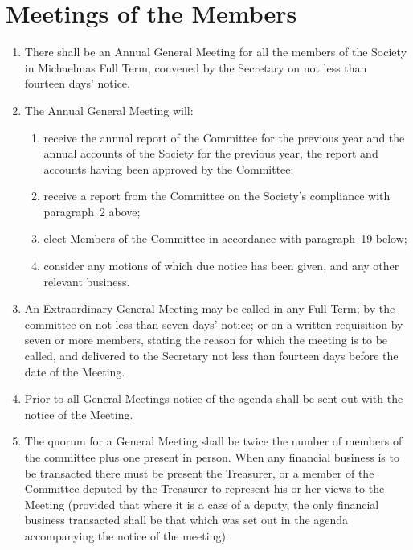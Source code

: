 \documentclass[11pt]{article}
\begin{document}
\section{Meetings of the Members}
\begin{enumerate}
\item There shall be an Annual General Meeting for all the members of the Society in Michaelmas Full Term, convened by the Secretary on not less than fourteen days' notice.
\item The Annual General Meeting will:
\begin{enumerate}
\item receive the annual report of the Committee for the previous year and the annual accounts of the Society for the previous year, the report and accounts having been approved by the Committee;
\item receive a report from the Committee on the Society's compliance with paragraph~2 above;
\item elect Members of the Committee in accordance with paragraph~19 below;
\item consider any motions of which due notice has been given, and any other relevant business.
\end{enumerate}
\item An Extraordinary General Meeting may be called in any Full Term; by the committee on not less than seven days' notice; or on a written requisition by seven or more members, stating the reason for which the meeting is to be called, and delivered to the Secretary not less than fourteen days before the date of the Meeting.
\item Prior to all General Meetings notice of the agenda shall be sent out with the notice of the Meeting.
\item The quorum for a General Meeting shall be twice the number of members of the committee plus one present in person. When any financial business is to be transacted there must be present the Treasurer, or a member of the Committee deputed by the Treasurer to represent his or her views to the Meeting (provided that where it is a case of a deputy, the only financial business transacted shall be that which was set out in the agenda accompanying the notice of the meeting).
\end{enumerate}
\end{document}
